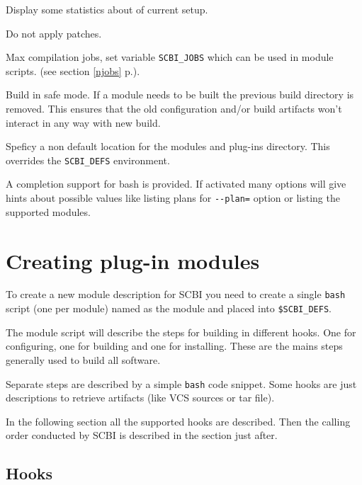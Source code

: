 \documentclass[a4paper,12pt,twoside]{article}
\newcommand{\code}[1]{\texttt{#1}}
\newcommand{\seeref}[1]{see section \ref{#1} p.\pageref{#1}}
\let\stdsection\section
\renewcommand\section{\newpage\stdsection}
\newcommand{\ddash}{-{}-}
\begin{document}
\begin{description}[font=\texttt]
	\item[\ddash{}stat] Display some statistics about of current setup.

	\item[-n | \ddash{}no-patch] Do not apply patches.

	\item[-j | \ddash{}jobs=<n>] Max compilation jobs, set variable \code{SCBI\_JOBS} which can be used in module scripts. (\seeref{njobs}).

	\item[\ddash{}safe] Build in safe mode. If a module needs to be built the previous build directory is removed. This ensures that the old configuration and/or build artifacts won't interact in any way with new build.

	\item[\ddash{}plugins=<directory>] Speficy a non default location for the modules and plug-ins directory. This overrides the \code{SCBI\_DEFS} environment.

\end{description}

A completion support for bash is provided. If activated many options will give hints about possible values like listing plans for \code{\ddash{}plan=} option or listing the supported modules.


\section{Creating plug-in modules}

To create a new module description for SCBI you need to create a single \code{bash} script (one per module) named as the module and placed into \code{\$SCBI\_DEFS}.

The module script will describe the steps for building in different hooks. One for configuring, one for building and one for installing. These are the mains steps generally used to build all software.

Separate steps are described by a simple \code{bash} code snippet. Some hooks are just descriptions to retrieve artifacts (like VCS sources or tar file).

In the following section all the supported hooks are described. Then the calling order conducted by SCBI is described in the section just after.

\subsection{Hooks}
\end{document}
